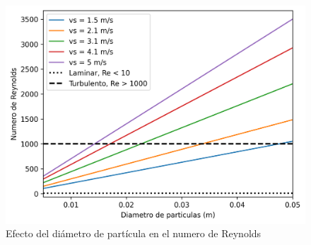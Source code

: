 \documentclass[12pt,letterpaper,final]{article}%
\begin{document}
\begin{figure}[ht!]\label{Reynolds_vs_Dp}
	\centering
	\includegraphics[scale=0.9]{RevsDp.png}
	\caption{Efecto del diámetro de partícula en el numero de Reynolds}
\end{figure}
\end{document}
